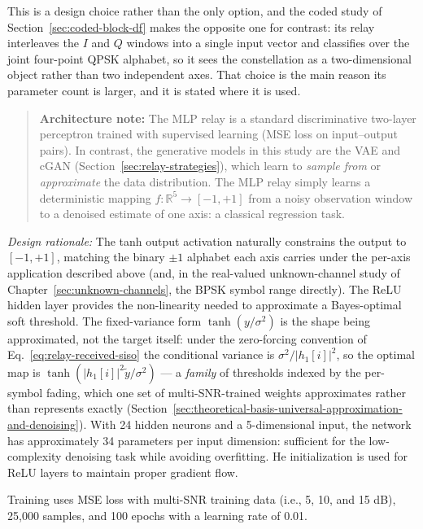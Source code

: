 \begin{enumerate}
This is a design choice rather than the only option, and the coded study of Section~\ref{sec:coded-block-df} makes the opposite one for contrast: its relay interleaves the $I$ and $Q$ windows into a single input vector and classifies over the joint four-point QPSK alphabet, so it sees the constellation as a two-dimensional object rather than two independent axes. That choice is the main reason its parameter count is larger, and it is stated where it is used.

\begin{quote}
\textbf{Architecture note:} The MLP relay is a standard discriminative two-layer perceptron trained with supervised learning (MSE loss on input--output pairs). In contrast, the generative models in this study are the VAE and cGAN (Section~\ref{sec:relay-strategies}), which learn to \emph{sample from} or \emph{approximate} the data distribution. The MLP relay simply learns a deterministic mapping \(f: \mathbb{R}^5 \to [-1,+1]\) from a noisy observation window to a denoised estimate of one axis: a classical regression task.
\end{quote}

\emph{Design rationale:} The tanh output activation naturally constrains the output to \([-1, +1]\), matching the binary $\pm 1$ alphabet each axis carries under the per-axis application described above (and, in the real-valued unknown-channel study of Chapter~\ref{sec:unknown-channels}, the BPSK symbol range directly).
The ReLU hidden layer provides the non-linearity needed to approximate a Bayes-optimal soft threshold. The fixed-variance form \(\tanh(y/\sigma^{2})\) is the shape being approximated, not the target itself: under the zero-forcing convention of Eq.~\eqref{eq:relay-received-siso} the conditional variance is \(\sigma^{2}/|h_1[i]|^{2}\), so the optimal map is \(\tanh(|h_1[i]|^{2}\tilde{y}/\sigma^{2})\) --- a \emph{family} of thresholds indexed by the per-symbol fading, which one set of multi-SNR-trained weights approximates rather than represents exactly (Section~\ref{sec:theoretical-basis-universal-approximation-and-denoising}). With 24 hidden neurons and a 5-dimensional input, the network has approximately 34 parameters per input dimension: sufficient for the low-complexity denoising task while avoiding overfitting. He initialization is used for ReLU layers to maintain proper gradient flow.

Training uses MSE loss with multi-SNR training data (i.e., 5, 10, and 15 dB), 25,000 samples, and 100 epochs with a learning rate of 0.01.


\end{enumerate}
